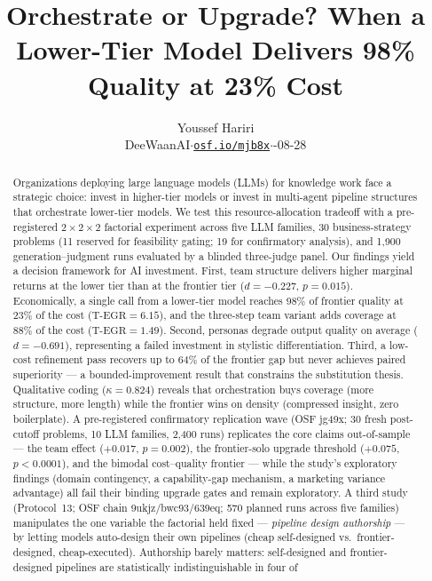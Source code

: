 \documentclass[12pt,a4paper]{article}
\title{\textbf{Orchestrate or Upgrade? When a Lower-Tier Model Delivers
98\% Quality at 23\% Cost}}
\author{Youssef Hariri\\
\small DeeWaanAI\quad $\cdot$\quad \href{https://osf.io/mjb8x}{\texttt{osf.io/mjb8x}}\quad $\cdot$\quad 2026-08-28}
\date{}
\newcommand{\TEGR}{\ensuremath{\text{T-EGR}}}
\begin{document}
\maketitle

\begin{abstract}
\noindent
Organizations deploying large language models (LLMs) for knowledge work face a
strategic choice: invest in higher-tier models or invest in multi-agent pipeline
structures that orchestrate lower-tier models. We test this resource-allocation
tradeoff with a pre-registered $2 \times 2 \times 2$ factorial experiment across
five LLM families, 30 business-strategy problems (11 reserved for feasibility
gating; 19 for confirmatory analysis), and 1{,}900
generation--judgment runs evaluated by a blinded three-judge panel. Our findings
yield a decision framework for AI investment. First, team structure delivers
higher marginal returns at the lower tier than at the frontier tier
($d = -0.227$, $p = 0.015$). Economically, a single call from a lower-tier
model reaches 98\% of frontier quality at 23\% of the cost ($\TEGR = 6.15$),
and the three-step team variant adds coverage at 88\% of the cost
($\TEGR = 1.49$). Second,
personas degrade output quality on average ($d = -0.691$), representing a
failed investment in stylistic differentiation. Third, a low-cost refinement
pass recovers up to 64\% of the frontier gap but never achieves paired
superiority --- a bounded-improvement result that constrains the substitution
thesis. Qualitative coding ($\kappa = 0.824$) reveals that orchestration buys
coverage (more structure, more length) while the frontier wins on density
(compressed insight, zero boilerplate). A pre-registered confirmatory
replication wave (OSF jg49x; 30 fresh post-cutoff problems, 10 LLM families,
2{,}400 runs) replicates the core claims out-of-sample --- the team effect
($+0.017$, $p = 0.002$), the frontier-solo upgrade threshold
($+0.075$, $p < 0.0001$), and the bimodal cost--quality frontier ---
while the study's exploratory findings (domain contingency, a capability-gap
mechanism, a marketing variance advantage) all fail their binding upgrade
gates and remain exploratory. A third study (Protocol~13; OSF chain
9ukjz/bwc93/639eq; 570 planned runs across five families) manipulates the one
variable the factorial held fixed --- \emph{pipeline design authorship} --- by
letting models auto-design their own pipelines (cheap self-designed vs.\
frontier-designed, cheap-executed). Authorship barely matters: self-designed
and frontier-designed pipelines are statistically indistinguishable in four of

\end{abstract}
\end{document}
